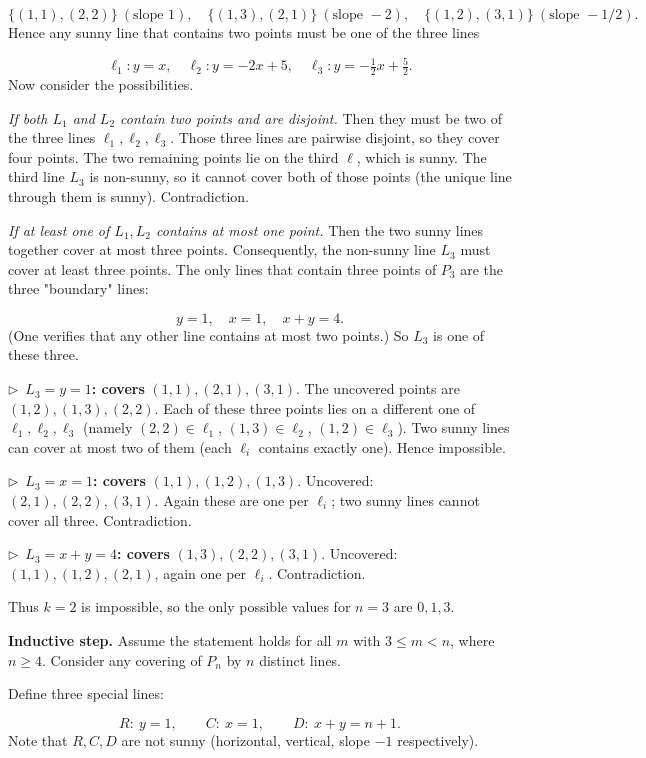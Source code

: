 \documentclass{llmxive}
\providecommand{\compactbullet}[1]{\par\noindent$\triangleright$~#1\par}
\begin{document}
\[
\{(1,1),(2,2)\}\ (\text{slope }1),\quad \{(1,3),(2,1)\}\ (\text{slope }-2),\quad \{(1,2),(3,1)\}\ (\text{slope }-1/2).
\]
Hence any sunny line that contains two points must be one of the three lines\par
\[
\ell_1: y=x,\quad \ell_2: y=-2x+5,\quad \ell_3: y=-\tfrac12 x+\tfrac52.
\]
Now consider the possibilities.\par
\emph{If both \(L_1\) and \(L_2\) contain two points and are disjoint.} Then they must be two of the three lines \(\ell_1,\ell_2,\ell_3\). Those three lines are pairwise disjoint, so they cover four points. The two remaining points lie on the third \(\ell\), which is sunny. The third line \(L_3\) is non-sunny, so it cannot cover both of those points (the unique line through them is sunny). Contradiction.\par
\emph{If at least one of \(L_1, L_2\) contains at most one point.} Then the two sunny lines together cover at most three points. Consequently, the non-sunny line \(L_3\) must cover at least three points. The only lines that contain three points of \(P_3\) are the three "boundary" lines:\par
\[
y=1,\quad x=1,\quad x+y=4.
\]
(One verifies that any other line contains at most two points.) So \(L_3\) is one of these three.\par
\compactbullet{\textbf{}\(L_3 = y=1\)\textbf{: covers }\((1,1),(2,1),(3,1)\). The uncovered points are \((1,2),(1,3),(2,2)\). Each of these three points lies on a different one of \(\ell_1,\ell_2,\ell_3\) (namely \((2,2)\in\ell_1\), \((1,3)\in\ell_2\), \((1,2)\in\ell_3\)). Two sunny lines can cover at most two of them (each \(\ell_i\) contains exactly one). Hence impossible.}
\compactbullet{\textbf{}\(L_3 = x=1\)\textbf{: covers }\((1,1),(1,2),(1,3)\). Uncovered: \((2,1),(2,2),(3,1)\). Again these are one per \(\ell_i\); two sunny lines cannot cover all three. Contradiction.}
\compactbullet{\textbf{}\(L_3 = x+y=4\)\textbf{: covers }\((1,3),(2,2),(3,1)\). Uncovered: \((1,1),(1,2),(2,1)\), again one per \(\ell_i\). Contradiction.}
Thus \(k = 2\) is impossible, so the only possible values for \(n=3\) are \(0,1,3\).\par
\textbf{Inductive step.} Assume the statement holds for all \(m\) with \(3 \le m < n\), where \(n \ge 4\). Consider any covering of \(P_n\) by \(n\) distinct lines.\par
Define three special lines:\par
\[
R:\ y=1,\qquad C:\ x=1,\qquad D:\ x+y = n+1.
\]
Note that \(R, C, D\) are not sunny (horizontal, vertical, slope \(-1\) respectively).\par
\end{document}
